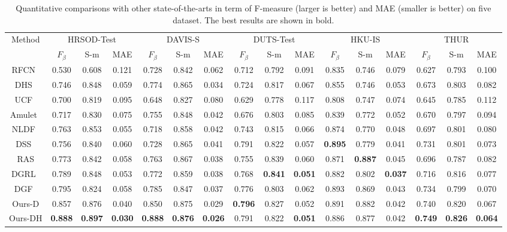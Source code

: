 \documentclass[10pt,twocolumn,letterpaper]{article}
\begin{document}
\begin{table*}
\begin{center}
\small
\setlength{\tabcolsep}{4.6pt}
\begin{tabular}{c||c|c|c|c|c|c|c|c|c|c|c|c|c|c|c|}
\toprule[2.5pt]
\multirow{2}{*}{Method}      &\multicolumn{3}{c|}{HRSOD-Test}&\multicolumn{3}{c|}{DAVIS-S}  & \multicolumn{3}{c|}{DUTS-Test}&  \multicolumn{3}{c|}{HKU-IS} & \multicolumn{3}{c|}{THUR}\\
\cline{2-16}
& $F_\beta$&S-m&MAE&$F_\beta$&S-m&MAE&$F_\beta$&S-m&MAE& $F_\beta$&S-m&MAE&$F_\beta$&S-m&MAE\\
\midrule[1pt]
RFCN~\cite{wang2016saliency}&0.530&0.608&0.121&0.728&0.842&0.062 &0.712 &0.792&0.091&0.835&0.746&0.079&0.627&0.793&0.100\\
DHS~\cite{liu2016dhsnet} &0.746&0.848&0.059&0.774&0.865&0.034&{0.724}&0.817&{0.067}&0.855&0.746&0.053&0.673&0.803&0.082\\
UCF~\cite{zhang2017learning} &0.700&0.819&0.095&0.648&0.827&0.080&0.629&0.778&0.117&0.808&0.747&0.074&0.645&0.785&0.112\\
Amulet~\cite{zhang2017amulet}&0.717&0.830&0.075&0.755&0.848&0.042&0.676&0.803&0.085&0.839&0.772&0.052&0.670&0.797&0.094\\
NLDF~\cite{luo2017non}&0.763&0.853&0.055&0.718&0.858&0.042&0.743&0.815&0.066&0.874&0.770&0.048&0.697&0.801&0.080\\
DSS~\cite{hou2017deeply}&0.756&0.840&0.060&0.728&0.865&0.041&0.791&0.822&{0.057}&\textbf{0.895}&0.779&0.041&0.731&0.801&0.073\\
RAS\cite{chen2018reverse}&0.773&0.842&0.058&0.763&0.867&0.038&0.755&0.839&0.060&0.871&\textbf{0.887}&0.045&0.696&0.787&0.082\\
DGRL~\cite{wang2018detect}&0.789&0.848&0.053&0.772&0.859&0.038&0.768&\textbf{0.841}&\textbf{0.051}&0.882&0.802&\textbf{0.037}&0.716&0.816&0.077\\
DGF~\cite{wu2018fast}&0.795&0.824&0.058&0.785&0.847&0.037&0.776&0.803&0.062&0.893&0.869&0.043&0.734&0.799&0.070\\
\midrule[1pt]
Ours-D&0.857&0.876&0.040&0.850&0.875&0.029&\textbf{0.796}&0.827&0.052&0.891&0.882&0.042&0.740&0.820&0.067\\
Ours-DH&\textbf{0.888}&\textbf{0.897}&\textbf{0.030}&\textbf{0.888}&\textbf{0.876}&\textbf{0.026}&0.791&0.822&\textbf{0.051}&0.886&0.877&0.042&\textbf{0.749}&\textbf{0.826}&\textbf{0.064}
\\
\bottomrule[1.5pt]
\end{tabular}
\end{center}
\caption{Quantitative comparisons with other state-of-the-arts in term of F-measure (larger is better) and MAE (smaller is better) on five dataset. The best results are shown in bold.}\label{tab-state}
\vspace{-4mm}
\end{table*}
\end{document}
